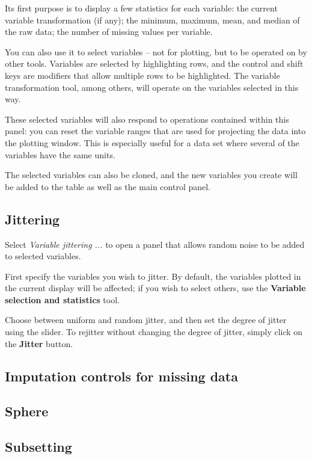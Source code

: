 \documentclass[11pt]{article}
\begin{document}
Its first purpose is to display a few statistics for each variable:
the current variable transformation (if any); the minimum, maximum,
mean, and median of the raw data; the number of missing values per variable.

You can also use it to select variables -- not for plotting, but to
be operated on by other tools.  Variables are selected by highlighting
rows, and the control and shift keys are modifiers that allow multiple
rows to be highlighted.  The variable transformation tool, among
others, will operate on the variables selected in this way.

These selected variables will also respond to operations contained
within this panel:  you can reset the variable ranges that are used
for projecting the data into the plotting window.  This is especially
useful for a data set where several of the variables have the same units.

The selected variables can also be cloned, and the new variables
you create will be added to the table as well as the main control panel.

\subsection{Jittering}

Select {\em Variable jittering ...} to open a panel that allows
random noise to be added to selected variables.

First specify the variables you wish to jitter.  By default, the
variables plotted in the current display will be affected; if you
wish to select others, use the {\bf Variable selection and
statistics} tool.

Choose between uniform and random jitter, and then set the degree of
jitter using the slider.  To rejitter without changing the degree of
jitter, simply click on the {\bf Jitter} button.

\subsection{Imputation controls for missing data}
\subsection{Sphere}
\label{slbl:Sphere}
\subsection{Subsetting}
\end{document}
